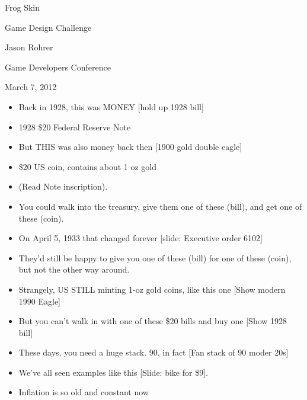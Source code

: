 \documentclass[12pt]{article}
\begin{document}
\begin{center}
Frog Skin

Game Design Challenge

Jason Rohrer

Game Developers Conference 

March 7, 2012
\end{center}


{\Huge



\begin{itemize}



\item Back in 1928, this was MONEY [hold up 1928 bill]

\item 1928 \$20 Federal Reserve Note

\item But THIS was also money back then [1900 gold double eagle]

\item \$20 US coin, contains about 1 oz gold

\item (Read Note inscription).

\item You could walk into the treasury, give them one of these (bill), and get one of these (coin).

\item On April 5, 1933 that changed forever [slide:  Executive order 6102]

\item They'd still be happy to give you one of these (bill) for one of these (coin), but not the other way around.







\item Strangely, US STILL minting 1-oz gold coins, like this one [Show modern 1990 Eagle]

\item But you can't walk in with one of these \$20 bills and buy one [Show 1928 bill]

\item These days, you need a huge stack.  90, in fact [Fan stack of 90 moder 20s]

\item We've all seen examples like this [Slide:  bike for \$9].


\item Inflation is so old and constant now


\end{itemize}}
\end{document}
